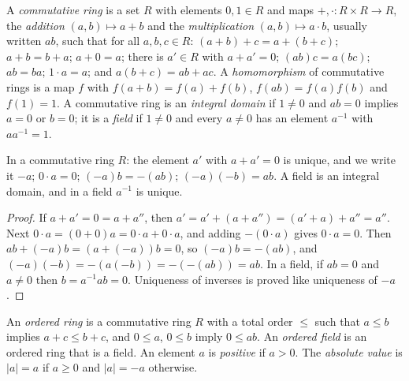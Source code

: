 \begin{definition}\label{number-systems:definition-commutative-ring}
A \emph{commutative ring} is a set $R$ with elements $0, 1 \in R$ and maps
$+, \cdot \colon R \times R \to R$, the \emph{addition} $(a, b) \mapsto a + b$ and the
\emph{multiplication} $(a, b) \mapsto a \cdot b$, usually written $ab$, such that for all
$a, b, c \in R$:
$(a + b) + c = a + (b + c)$; $a + b = b + a$; $a + 0 = a$; there is $a' \in R$
with $a + a' = 0$; $(ab)c = a(bc)$; $ab = ba$; $1 \cdot a = a$; and
$a(b + c) = ab + ac$. A \emph{homomorphism} of commutative rings is a map
$f$ with $f(a + b) = f(a) + f(b)$, $f(ab) = f(a) f(b)$ and $f(1) = 1$. A
commutative ring is an \emph{integral domain} if $1 \neq 0$ and $ab = 0$ implies
$a = 0$ or $b = 0$; it is a \emph{field} if $1 \neq 0$ and every $a \neq 0$ has an
element $a^{-1}$ with $a a^{-1} = 1$.
\end{definition}

\begin{lemma}\label{number-systems:lemma-ring-identities}
In a commutative ring $R$: the element $a'$ with $a + a' = 0$ is unique, and we
write it $-a$; $0 \cdot a = 0$; $(-a) b = -(ab)$; $(-a)(-b) = ab$. A field is an
integral domain, and in a field $a^{-1}$ is unique.
\end{lemma}

\begin{proof}
If $a + a' = 0 = a + a''$, then $a' = a' + (a + a'') = (a' + a) + a'' = a''$. Next
$0 \cdot a = (0 + 0) a = 0 \cdot a + 0 \cdot a$, and adding $-(0 \cdot a)$ gives
$0 \cdot a = 0$. Then $ab + (-a)b = (a + (-a))b = 0$, so $(-a)b = -(ab)$, and
$(-a)(-b) = -(a(-b)) = -(-(ab)) = ab$. In a field, if $ab = 0$ and $a \neq 0$ then
$b = a^{-1}ab = 0$. Uniqueness of inverses is proved like uniqueness of $-a$.
\end{proof}

\begin{definition}\label{number-systems:definition-ordered-field}
An \emph{ordered ring} is a commutative ring $R$ with a total order $\leq$
such that $a \leq b$ implies $a + c \leq b + c$, and $0 \leq a$, $0 \leq b$ imply
$0 \leq ab$. An \emph{ordered field} is an ordered ring that is a field. An
element $a$ is \emph{positive} if $a > 0$. The \emph{absolute value} is
$|a| = a$ if $a \geq 0$ and $|a| = -a$ otherwise.
\end{definition}

